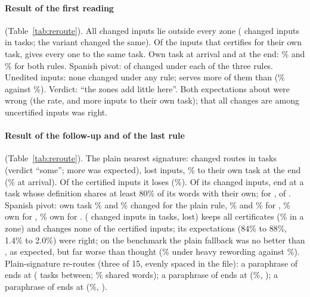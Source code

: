 \paragraph{Result of the first reading} (Table~\ref{tab:reroute}). All changed inputs lie outside every zone (\nearest{} changed inputs in \RerouteNearTasks{} tasks; the variant \exactfirst{} changed the same). Of the \RerouteCertOwn{} inputs that \cert{} certifies for their own task, \nearest{} gives every one to the same task. Own task at arrival and at the end: \RerouteCertOwnStart{}\% and \RerouteCertOwnEnd{}\% for both rules. Spanish pivot: \RerouteCertEsNChanged{} of \RerouteInputsPivot{} changed under each of the three rules. Unedited inputs: none changed under any rule; \nearest{} serves more of them than \cert{} (\RerouteNearUnOwn{}\% against \RerouteCertUnOwn{}\%). Verdict: ``the zones add little here''. Both expectations about \nearest{} were wrong (the rate, and more inputs to their own task); that all changes are among uncertified inputs was right.

\paragraph{Result of the follow-up and of the last rule} (Table~\ref{tab:reroute}). The plain nearest signature: \RerouteSigNChanged{} changed routes in \RerouteSigTasks{} tasks (verdict ``some''; more was expected), \RerouteSigNLost{} lost inputs, \RerouteSigOwnEnd{}\% to their own task at the end (\RerouteSigOwnStart{}\% at arrival). Of the \RerouteCertOwn{} certified inputs it loses \RerouteSigLostOfCert{} (\RerouteSigLostOfCertPct{}\%). Of its \RerouteSigNChanged{} changed inputs, \RerouteSigToSibling{} end at a task whose definition shares at least 80\% of its words with their own; for \nearest{}, \RerouteNearToSibling{} of \RerouteNearNChanged{}. Spanish pivot: own task \RerouteSigEsOwn{}\% and \RerouteSigEsChanged{}\% changed for the plain rule, \RerouteCertEsOwn{}\% and \RerouteCertEsChanged{}\% for \cert{}, \RerouteNearEsOwn{}\% own for \nearest{}, \RerouteBgEsOwn{}\% own for \scaled{}. \hybrid{} (\RerouteHybNChanged{} changed inputs in \RerouteHybTasks{} tasks, \RerouteHybNLost{} lost) keeps all certificates (\RerouteHybInZone{}\% in a zone) and changes none of the certified inputs; its expectations (84\% to 88\%, 1.4\% to 2.0\%) were right; on the benchmark the plain fallback was no better than \cert{}, as expected, but far worse than thought (\RerouteHybBenchFiveHeavyOwn{}\% under heavy rewording against \RerouteCertBenchFiveHeavyOwn{}\%). Plain-signature re-routes (three of 15, evenly spaced in the file): a \RerouteExOnePivot{} paraphrase of \texttt{\RerouteExOneTask{}} ends at \texttt{\RerouteExOneEnd{}} (\RerouteExOneBetween{} tasks between; \RerouteExOneShare{}\% shared words); a \RerouteExTwoPivot{} paraphrase of \texttt{\RerouteExTwoTask{}} ends at \texttt{\RerouteExTwoEnd{}} (\RerouteExTwoShare{}\%, \RerouteExTwoBetween{}); a \RerouteExThreePivot{} paraphrase of \texttt{\RerouteExThreeTask{}} ends at \texttt{\RerouteExThreeEnd{}} (\RerouteExThreeShare{}\%, \RerouteExThreeBetween{}).


